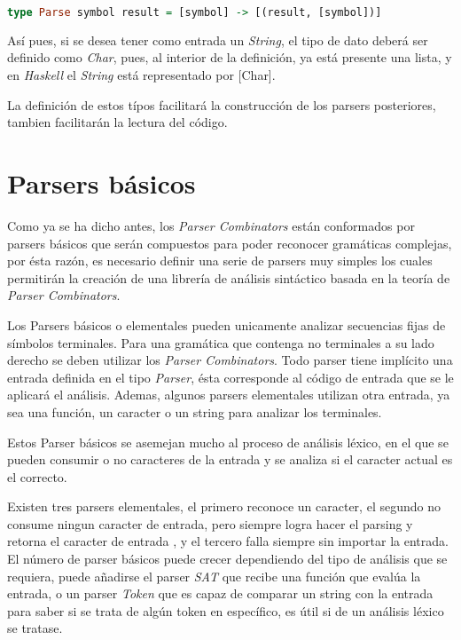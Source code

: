 \begin{lstlisting}[language=Haskell]
type Parse symbol result = [symbol] -> [(result, [symbol])]
\end{lstlisting}

Así pues, si se desea tener como entrada un \emph{String}, el tipo de dato deberá ser definido como \emph{Char}, pues, al interior de la definición, ya está presente una lista, y en \emph{Haskell} el \emph{String} está representado por [Char].

La definición de estos típos facilitará la construcción de los parsers posteriores, tambien facilitarán la lectura del código.


\section{Parsers básicos}

Como ya se ha dicho antes, los \emph{Parser Combinators} están conformados por parsers básicos que serán compuestos para poder reconocer gramáticas complejas, por ésta razón, es necesario definir una serie de parsers muy simples los cuales permitirán la creación de una librería de análisis sintáctico basada en la teoría de \emph{Parser Combinators}. \cite{Jeuring2010,Hutton2007}

Los Parsers básicos o elementales pueden unicamente analizar secuencias fijas de símbolos terminales. Para una gramática que contenga no terminales a su lado derecho se deben utilizar los \emph{Parser Combinators}. \cite{Jeuring2010} Todo parser tiene implícito una entrada definida en el tipo \emph{Parser}, ésta corresponde al código de entrada que se le aplicará el análisis. Ademas, 
algunos parsers elementales utilizan otra entrada, ya sea una función, un caracter o un string para analizar los terminales.

Estos Parser básicos se asemejan mucho al proceso de análisis léxico, en el que se pueden consumir o no caracteres de la entrada y se analiza si el caracter actual es el correcto.

Existen tres parsers elementales, el primero reconoce un caracter, el segundo no consume ningun caracter de entrada, pero siempre logra hacer el parsing y retorna el caracter de entrada , y el tercero falla siempre sin importar la entrada. El número de parser básicos puede crecer dependiendo del tipo de análisis que se requiera, puede añadirse el parser \emph{SAT} que recibe una función que evalúa la entrada, o un parser \emph{Token} que es capaz de comparar un string con la entrada para saber si se trata de algún token en específico, es útil si de un análisis léxico se tratase.
 

